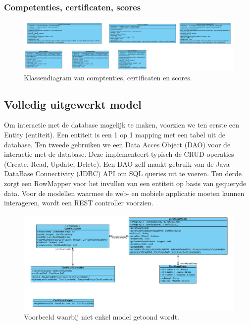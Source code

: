 \documentclass[a4paper]{article}
\begin{document}
\subsubsection{Competenties, certificaten, scores}
\begin{figure}[H]
  \includegraphics[width=\textwidth]{uml_rest}
  \caption{Klassendiagram van comptenties, certificaten en scores.}
  \label{fig:uml_rest}
\end{figure}

\subsection{Volledig uitgewerkt model} \label{uml_voorbeeld}
Om interactie met de database mogelijk te maken, voorzien we ten eerste een Entity (entiteit). Een entiteit is een 1 op 1 mapping met een tabel uit de database. Ten tweede gebruiken we een Data Acces Object (DAO) voor de interactie met de database. Deze implementeert typisch de CRUD-operaties (Create, Read, Update, Delete). Een DAO zelf maakt gebruik van de Java DataBase Connectivity (JDBC) API om SQL queries uit te voeren. Ten derde zorgt een RowMapper voor het invullen van een entiteit op basis van gequeryde data. Voor de modellen waarmee de web- en mobiele applicatie moeten kunnen interageren, wordt een REST controller voorzien. 

\begin{figure}[H]
  \includegraphics[width=\textwidth]{uml_voorbeeld}
  \caption{Voorbeeld waarbij niet enkel model getoond wordt.}
  \label{fig:uml_voorbeeld}
\end{figure}
\end{document}
